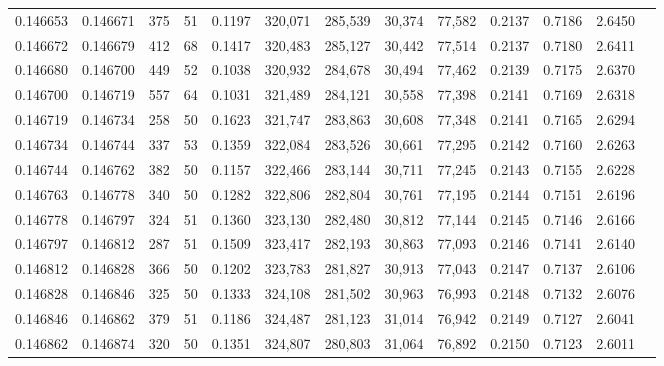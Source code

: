 \begin{tabular}{rrrrrrrrrrrrr}
0.146653 & 0.146671 &   375 &  51 &                                     0.1197 & 320,071 & 285,539 &  30,374 &  77,582 & 0.2137 & 0.7186 & 2.6450 \\
0.146672 & 0.146679 &   412 &  68 &                                     0.1417 & 320,483 & 285,127 &  30,442 &  77,514 & 0.2137 & 0.7180 & 2.6411 \\
0.146680 & 0.146700 &   449 &  52 &                                     0.1038 & 320,932 & 284,678 &  30,494 &  77,462 & 0.2139 & 0.7175 & 2.6370 \\
0.146700 & 0.146719 &   557 &  64 &                                     0.1031 & 321,489 & 284,121 &  30,558 &  77,398 & 0.2141 & 0.7169 & 2.6318 \\
0.146719 & 0.146734 &   258 &  50 &                                     0.1623 & 321,747 & 283,863 &  30,608 &  77,348 & 0.2141 & 0.7165 & 2.6294 \\
0.146734 & 0.146744 &   337 &  53 &                                     0.1359 & 322,084 & 283,526 &  30,661 &  77,295 & 0.2142 & 0.7160 & 2.6263 \\
0.146744 & 0.146762 &   382 &  50 &                                     0.1157 & 322,466 & 283,144 &  30,711 &  77,245 & 0.2143 & 0.7155 & 2.6228 \\
0.146763 & 0.146778 &   340 &  50 &                                     0.1282 & 322,806 & 282,804 &  30,761 &  77,195 & 0.2144 & 0.7151 & 2.6196 \\
0.146778 & 0.146797 &   324 &  51 &                                     0.1360 & 323,130 & 282,480 &  30,812 &  77,144 & 0.2145 & 0.7146 & 2.6166 \\
0.146797 & 0.146812 &   287 &  51 &                                     0.1509 & 323,417 & 282,193 &  30,863 &  77,093 & 0.2146 & 0.7141 & 2.6140 \\
0.146812 & 0.146828 &   366 &  50 &                                     0.1202 & 323,783 & 281,827 &  30,913 &  77,043 & 0.2147 & 0.7137 & 2.6106 \\
0.146828 & 0.146846 &   325 &  50 &                                     0.1333 & 324,108 & 281,502 &  30,963 &  76,993 & 0.2148 & 0.7132 & 2.6076 \\
0.146846 & 0.146862 &   379 &  51 &                                     0.1186 & 324,487 & 281,123 &  31,014 &  76,942 & 0.2149 & 0.7127 & 2.6041 \\
0.146862 & 0.146874 &   320 &  50 &                                     0.1351 & 324,807 & 280,803 &  31,064 &  76,892 & 0.2150 & 0.7123 & 2.6011 \\

\end{tabular}
